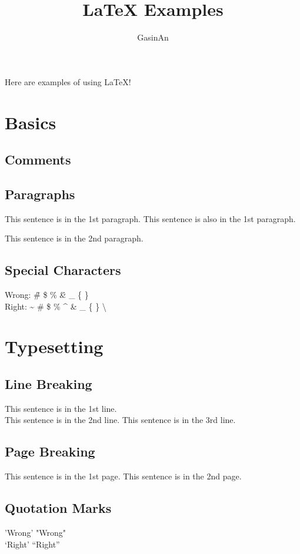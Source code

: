 \documentclass[a4paper,10pt]{article}
\title{\LaTeX{} Examples}
\author{GasinAn}
\begin{document}
    \maketitle
    Here are examples of using \LaTeX{}!
    \section{Basics}
    \subsection{Comments}

    \subsection{Paragraphs}
    This sentence is in the 1st paragraph.
    This sentence is also in the 1st paragraph.

    This sentence is in the 2nd paragraph.
    \subsection{Special Characters}
    Wrong: \~ \# \$ \% \^ \& \_ \{ \} \\
    Right: \~{} \#{} \${} \%{} \^{} \&{} \_{} \{{} \}{} \textbackslash{}
    \section{Typesetting}
    \subsection{Line Breaking}
    This sentence is in the 1st line.\\
    This sentence is in the 2nd line.\newline
    This sentence is in the 3rd line.
    \subsection{Page Breaking}
    This sentence is in the 1st page.\newpage
    This sentence is in the 2nd page.
    \subsection{Quotation Marks}
    'Wrong' "Wrong"\\
    `Right' ``Right''
\end{document}
